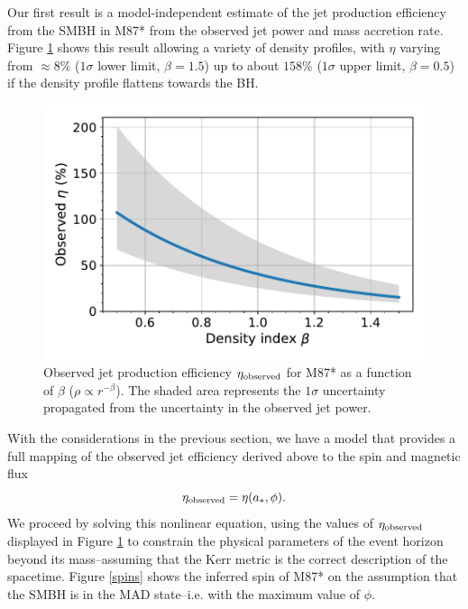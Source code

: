 \documentclass[twocolumn, linenumbers]{aastex62} %
\begin{document}
Our first result is a model-independent estimate of the jet production efficiency from the SMBH in M87* from the observed jet power and mass accretion rate. Figure \ref{obs-eta} shows this result allowing a variety of density profiles, with $\eta$ varying from $\approx 8\%$ ($1\sigma$ lower limit, $\beta=1.5$) up to about $158\%$ ($1\sigma$ upper limit, $\beta=0.5$) if the density profile flattens towards the BH.

\begin{figure}[h]
\centering
\includegraphics[width=\linewidth]{figures/observed-eta.pdf}
\caption{Observed jet production efficiency $\eta_{\rm observed}$ for M87* as a function of $\beta$ ($\rho \propto r^{-\beta}$). The shaded area represents the $1\sigma$ uncertainty propagated from the uncertainty in the observed jet power. }
\label{obs-eta}
\end{figure}

With the considerations in the previous section, we have a model that provides a full mapping of the observed jet efficiency derived above to the spin and magnetic flux 
\begin{equation}    \label{eq}
\eta_{\rm observed}=\eta(a_*, \phi).
\end{equation}
We proceed by solving this nonlinear equation, using the values of $\eta_{\rm observed}$ displayed in Figure \ref{obs-eta} to constrain the physical parameters of the event horizon beyond its mass--assuming that the Kerr metric is the correct description of the spacetime. Figure \ref{spins} shows the inferred spin of M87* on the assumption that the SMBH is in the MAD state--i.e. with the maximum value of $\phi$. 
\end{document}
